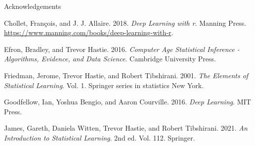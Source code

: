 \documentclass[
  10pt,
  ignorenonframetext,
]{beamer}
\newlength{\cslhangindent}
\newlength{\cslentryspacingunit} %
\newenvironment{CSLReferences}[2] %
 {%
  \setlength{\parindent}{0pt}
  \ifodd #1
  \let\oldpar\par
  \def\par{\hangindent=\cslhangindent\oldpar}
  \fi
  \setlength{\parskip}{#2\cslentryspacingunit}
 }%
 {}
\begin{document}
\begin{frame}{Acknowledgements}
\protect\hypertarget{acknowledgements-1}{}
\hypertarget{refs}{}
\begin{CSLReferences}{1}{0}
\leavevmode{}%
Chollet, François, and J. J. Allaire. 2018. \emph{Deep Learning with r}.
Manning Press. \url{https://www.manning.com/books/deep-learning-with-r}.

\leavevmode{}%
Efron, Bradley, and Trevor Hastie. 2016. \emph{Computer Age Statistical
Inference - Algorithms, Evidence, and Data Science}. Cambridge
University Press.

\leavevmode{}%
Friedman, Jerome, Trevor Hastie, and Robert Tibshirani. 2001. \emph{The
Elements of Statistical Learning}. Vol. 1. Springer series in statistics
New York.

\leavevmode{}%
Goodfellow, Ian, Yoshua Bengio, and Aaron Courville. 2016. \emph{Deep
Learning}. MIT Press.

\leavevmode{}%
James, Gareth, Daniela Witten, Trevor Hastie, and Robert Tibshirani.
2021. \emph{An Introduction to Statistical Learning}. 2nd ed. Vol. 112.
Springer.

\end{CSLReferences}
\end{frame}
\end{document}
